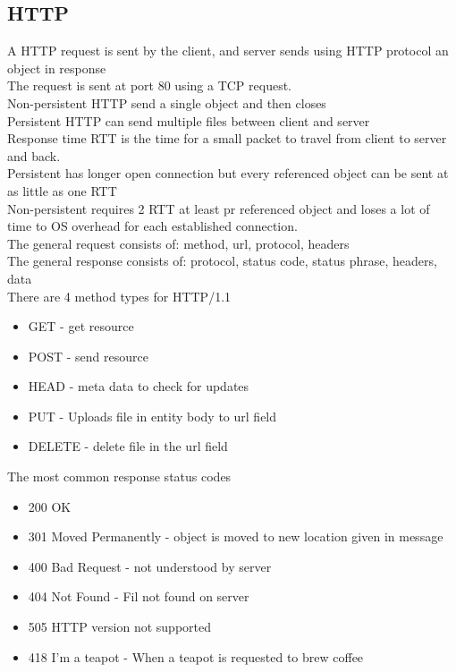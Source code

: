 \documentclass[12pt, a4paper]{article}
\begin{document}
		\subsection{HTTP}
			A HTTP request is sent by the client, and server sends using HTTP protocol an object in response\\
			The request is sent at port 80 using a TCP request.\\
			Non-persistent HTTP send a single object and then closes\\
			Persistent HTTP can send multiple files between client and server\\
			Response time RTT is the time for a small packet to travel from client to server and back.\\
			Persistent has longer open connection but every referenced object can be sent at as little as one RTT\\
			Non-persistent requires 2 RTT at least pr referenced object and loses a lot of time to OS overhead for each established connection.\\[4mm]
			The general request consists of: method, url, protocol, headers\\
			The general response consists of: protocol, status code, status phrase, headers, data\\
			There are 4 method types for HTTP/1.1
			\begin{itemize}
				\item GET - get resource
				\item POST - send resource
				\item HEAD - meta data to check for updates
				\item PUT - Uploads file in entity body to url field
				\item DELETE - delete file in the url field
			\end{itemize}
			The most common response status codes
			\begin{itemize}
				\item 200 OK
				\item 301 Moved Permanently - object is moved to new location given in message
				\item 400 Bad Request - not understood by server
				\item 404 Not Found - Fil not found on server
				\item 505 HTTP version not supported 
				\item 418 I'm a teapot - When a teapot is requested to brew coffee
			\end{itemize}
\end{document}
